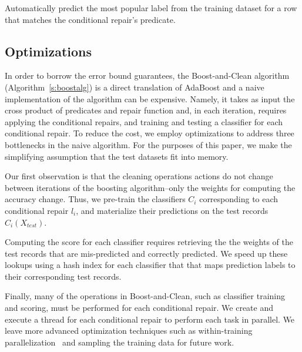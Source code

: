  Automatically predict the most popular label from the training dataset for a row that matches the conditional repair's predicate.




\subsection{Optimizations}
In order to borrow the error bound guarantees, the Boost-and-Clean algorithm (Algorithm~\ref{s:boostalg}) is a direct translation of AdaBoost and a naive implementation of the algorithm can be expensive.  Namely, it takes as input the cross product of predicates and repair function and, in each iteration, requires applying the conditional repairs, and training and testing a classifier for each conditional repair.  To reduce the cost, we employ optimizations to address three bottlenecks in the naive algorithm.  For the purposes of this paper, we make the simplifying assumption that the test datasets fit into memory.

 Our first observation is that the cleaning operations actions do not change between iterations of the boosting algorithm--only the weights for computing the accuracy change.  Thus, we pre-train the classifiers $C_i$ corresponding to each conditional repair $l_i$, and materialize their predictions on the test records $C_i(X_{test})$.  

 Computing the score for each classifier requires retrieving the the weights of the test records that are mis-predicted and correctly predicted.  We speed up these lookups using a hash index for each classifier that that maps prediction labels to their corresponding test records.

  Finally, many of the operations in Boost-and-Clean, such as classifier training and scoring, must be performed for each conditional repair.  We create and execute a thread for each conditional repair to perform each task in parallel.  We leave more advanced optimization techniques such as within-training parallelization~\cite{recht2011hogwild} and sampling the training data for future work.